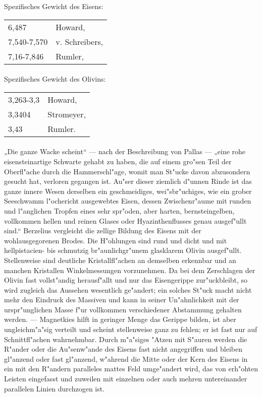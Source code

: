 \documentclass[a4paper, 11pt, oneside]{article}
\begin{document}
Spezifisches Gewicht des Eisens:  
\begin{table}[!ht]
    \centering
    \begin{tabular}{l l}
        6,487 & Howard,\\
        7,540-7,570 & v. Schreibers,\\
        7,16-7,846 & Rumler,
    \end{tabular}
\end{table}
\paragraph{}
Spezifisches Gewicht des Olivins:  
\begin{table}[!ht]
    \centering
    \begin{tabular}{l l}
        3,263-3,3 & Howard,\\
        3,3404 & Stromeyer,\\
        3,43 & Rumler.
    \end{tabular}
\end{table}
\paragraph{}
„Die ganze Wacke scheint“ --- nach der Beschreibung von Pallas --- „eine rohe eisensteinartige Schwarte gehabt zu haben, die auf einem gro"sen Teil der Oberfl"ache durch die Hammerschl"age, womit man St"ucke davon abzusondern gesucht hat, verloren gegangen ist. Au"ser dieser ziemlich d"unnen Rinde ist das ganze innere Wesen derselben ein geschmeidiges, wei"sbr"uchiges, wie ein grober Seeschwamm l"ochericht ausgewebtes Eisen, dessen Zwischenr"aume mit runden und l"anglichen Tropfen eines sehr spr"oden, aber harten, bernsteingelben, vollkommen hellen und reinen Glases oder Hyazinthenflusses genau ausgef"ullt sind.“ Berzelius vergleicht die zellige Bildung des Eisens mit der wohlausgegorenen Brodes. Die H"ohlungen sind rund und dicht und mit hellpistacien- bis schmutzig br"aunlichgr"unem glasklarem Olivin ausgef"ullt. Stellenweise sind deutliche Kristallfl"achen an demselben erkennbar und an manchen Kristallen Winkelmessungen vorzunehmen. Da bei dem Zerschlagen der Olivin fast vollst"andig herausf"allt und nur das Eisengerippe zur"uckbleibt, so wird zugleich das Aussehen wesentlich ge"andert; ein solches St"uck macht nicht mehr den Eindruck des Massiven und kann in seiner Un"ahnlichkeit mit der urspr"unglichen Masse f"ur vollkommen verschiedener Abstammung gehalten werden. --- Magnetkies hilft in geringer Menge das Gerippe bilden, ist aber ungleichm"a"sig verteilt und scheint stellenweise ganz zu fehlen; er ist fast nur auf Schnittfl"achen wahrnehmbar. Durch m"a"siges "Atzen mit S"auren werden die R"ander oder die Au"senw"ande des Eisens fast nicht angegriffen und bleiben gl"anzend oder fast gl"anzend, w"ahrend die Mitte oder der Kern des Eisens in ein mit den R"andern paralleles mattes Feld umge"andert wird, das von erh"ohten Leisten eingefasst und zuweilen mit einzelnen oder auch mehren untereinander parallelen Linien durchzogen ist.
\end{document}
